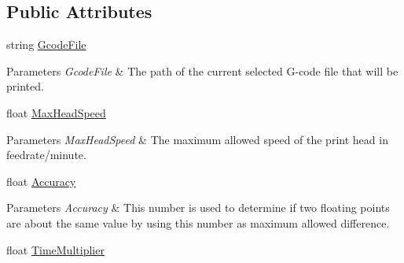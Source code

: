 \subsection*{Public Attributes}
\begin{DoxyCompactItemize}
\item 
\mbox{\label{class_printer_a7365c931dcf27f89d8bec83821c907d5}} 
string \hyperlink{class_printer_a7365c931dcf27f89d8bec83821c907d5}{Gcode\+File}
\begin{DoxyCompactList}\small\item\em 
\begin{DoxyParams}{Parameters}
{\em Gcode\+File} & The path of the current selected G-\/code file that will be printed.\\
\hline
\end{DoxyParams}
\end{DoxyCompactList}\item 
\mbox{\label{class_printer_a3684a4faa07bad0e412b8832d5fe5504}} 
float \hyperlink{class_printer_a3684a4faa07bad0e412b8832d5fe5504}{Max\+Head\+Speed}
\begin{DoxyCompactList}\small\item\em 
\begin{DoxyParams}{Parameters}
{\em Max\+Head\+Speed} & The maximum allowed speed of the print head in feedrate/minute.\\
\hline
\end{DoxyParams}
\end{DoxyCompactList}\item 
\mbox{\label{class_printer_a5865d4c4ced50e876c5f70c51d00e72a}} 
float \hyperlink{class_printer_a5865d4c4ced50e876c5f70c51d00e72a}{Accuracy}
\begin{DoxyCompactList}\small\item\em 
\begin{DoxyParams}{Parameters}
{\em Accuracy} & This number is used to determine if two floating points are about the same value by using this number as maximum allowed difference.\\
\hline
\end{DoxyParams}
\end{DoxyCompactList}\item 
\mbox{\label{class_printer_a11c6f4a9064aea0957e6a0ed5c6fd656}} 
float \hyperlink{class_printer_a11c6f4a9064aea0957e6a0ed5c6fd656}{Time\+Multiplier}

\end{DoxyCompactItemize}
